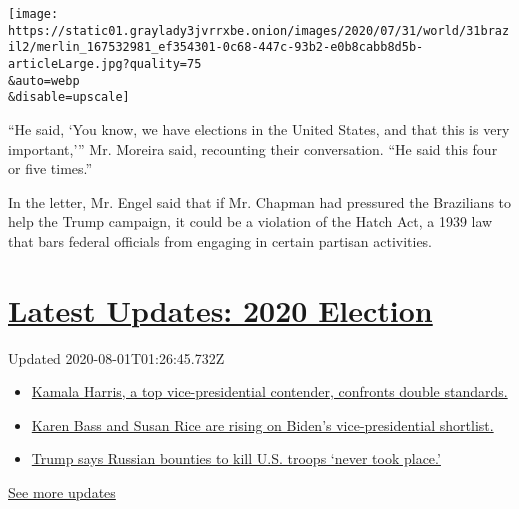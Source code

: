 \texttt{[image: https://static01.graylady3jvrrxbe.onion/images/2020/07/31/world/31brazil2/merlin\_167532981\_ef354301-0c68-447c-93b2-e0b8cabb8d5b-articleLarge.jpg?quality=75\\\&auto=webp\\\&disable=upscale]}

``He said, `You know, we have elections in the United States, and that
this is very important,''' Mr. Moreira said, recounting their
conversation. ``He said this four or five times.''

In the letter, Mr. Engel said that if Mr. Chapman had pressured the
Brazilians to help the Trump campaign, it could be a violation of the
Hatch Act, a 1939 law that bars federal officials from engaging in
certain partisan activities.

\hypertarget{latest-updates-2020-election}{%
\section{\texorpdfstring{\href{https://www.nytimes3xbfgragh.onion/2020/07/31/us/elections/biden-vs-trump.html?action=click\&pgtype=Article\&state=default\&region=MAIN_CONTENT_1\&context=storylines_live_updates}{Latest
Updates: 2020
Election}}{Latest Updates: 2020 Election}}\label{latest-updates-2020-election}}

Updated 2020-08-01T01:26:45.732Z

\begin{itemize}
\tightlist
\item
  \href{https://www.nytimes3xbfgragh.onion/2020/07/31/us/elections/biden-vs-trump.html?action=click\&pgtype=Article\&state=default\&region=MAIN_CONTENT_1\&context=storylines_live_updates\#link-29fdff45}{Kamala
  Harris, a top vice-presidential contender, confronts double
  standards.}
\item
  \href{https://www.nytimes3xbfgragh.onion/2020/07/31/us/elections/biden-vs-trump.html?action=click\&pgtype=Article\&state=default\&region=MAIN_CONTENT_1\&context=storylines_live_updates\#link-13ec3d9c}{Karen
  Bass and Susan Rice are rising on Biden's vice-presidential
  shortlist.}
\item
  \href{https://www.nytimes3xbfgragh.onion/2020/07/31/us/elections/biden-vs-trump.html?action=click\&pgtype=Article\&state=default\&region=MAIN_CONTENT_1\&context=storylines_live_updates\#link-49e9a016}{Trump
  says Russian bounties to kill U.S. troops `never took place.'}
\end{itemize}

\href{https://www.nytimes3xbfgragh.onion/2020/07/31/us/elections/biden-vs-trump.html?action=click\&pgtype=Article\&state=default\&region=MAIN_CONTENT_1\&context=storylines_live_updates}{See
more updates}

